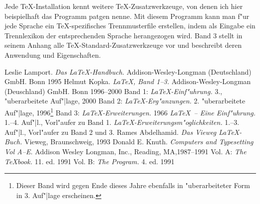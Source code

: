 \documentclass{article}
\begin{document}
Jede \TeX-Installation kennt weitere  \TeX-Zusatzwerkzeuge, von denen ich hier
beispielhaft das Programm patgen nenne. Mit diesem Programm kann man
f"ur jede Sprache ein \TeX-spezifisches Trennmusterfile erstellen,
indem als Eingabe ein Trennlexikon der entsprechenden Sprache herangezogen
wird. Band 3 stellt in seinem Anhang alle \TeX-Standard-Zusatzwerkzeuge vor und
beschreibt deren Anwendung und Eigenschaften.

\begin{thebibliography}{\hspace{1.5cm}}
 Leslie Lamport. \textsl{Das \LaTeX-Handbuch.}
    Addison-Wesley-Longman (Deutschland) GmbH. Bonn 1995
 Helmut Kopka. \textsl{\LaTeX, Band 1--3.} 
    Addison-Wesley-Longman (Deuschland) GmbH. Bonn 1996--2000
 Band 1: \textsl{\LaTeX-Einf"uhrung.} 3., "uberarbeitete
    Auf"|lage, 2000
 Band 2: \textsl{\LaTeX-Erg"anzungen.} 2. "uberarbeitete
    Auf"|lage, 1996\footnote{Dieser Band wird gegen Ende dieses Jahre ebenfalls
    in "uberarbeiteter Form in 3. Auf"|lage erscheinen.}
 Band 3: \textsl{\LaTeX-Erweiterungen.} 1966
 \textsl{\LaTeX\ -- Eine Einf"uhrung.} 1.--4. Auf"|l.,
    Vorl"aufer zu Band 1.
 \textsl{\LaTeX-Erweiterungsm"oglichkeiten.} 
    1.--3. Auf"|l., Vorl"aufer zu Band 2 und 3.
 Rames Abdelhamid. \textsl{Das Vieweg \LaTeX-Buch.}
    Vieweg, Braunschweig, 1993
 Donald E. Knuth. \textsl{Computers and Typesetting
    Vol A--E.} Addison Wesley Longman, Inc., Reading, MA,1987--1991
 Vol. A: \textsl{The \TeX book.} 11. ed. 1991
 Vol. B: \textsl{The Program.} 4. ed. 1991
\end{thebibliography}
\end{document}
